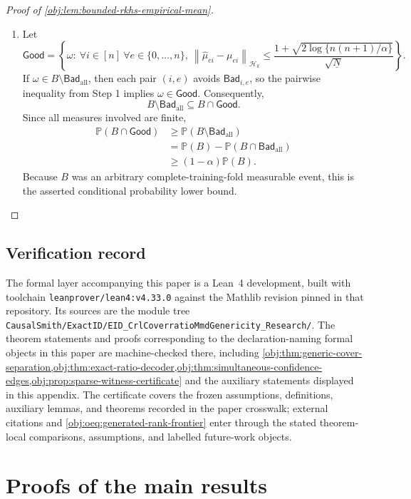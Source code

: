 \documentclass[11pt]{article}
\begin{document}
\begin{proof}[Proof of \cref{obj:lem:bounded-rkhs-empirical-mean}]
\begin{enumerate}
\item Let
\[
\mathsf{Good}
=
\left\{
\omega:\ 
\forall i\in[n]\ \forall e\in\{0,\ldots,n\},\
\left\|\widehat\mu_{ei}-\mu_{ei}\right\|_{\mathcal H_k}
\le
\frac{1+\sqrt{2\log\{n(n+1)/\alpha\}}}{\sqrt{\underline N}}
\right\}.
\]
If \(\omega\in B\setminus\mathsf{Bad}_{\mathrm{all}}\), then each pair \((i,e)\) avoids \(\mathsf{Bad}_{i,e}\), so the pairwise inequality from Step 1 implies \(\omega\in\mathsf{Good}\).  Consequently,
\[
B\setminus\mathsf{Bad}_{\mathrm{all}}\subseteq B\cap\mathsf{Good}.
\]
Since all measures involved are finite,
\[
\begin{aligned}
\mathbb P(B\cap\mathsf{Good})
&\ge
\mathbb P(B\setminus\mathsf{Bad}_{\mathrm{all}})\\
&=
\mathbb P(B)-\mathbb P(B\cap\mathsf{Bad}_{\mathrm{all}})\\
&\ge
(1-\alpha)\mathbb P(B).
\end{aligned}
\]
Because \(B\) was an arbitrary complete-training-fold measurable event, this is the asserted conditional probability lower bound. %
\end{enumerate}
\end{proof}

\subsection*{Verification record}

The formal layer accompanying this paper is a Lean~4 development, built with toolchain \texttt{leanprover/lean4:v4.33.0} against the Mathlib revision pinned in that repository. Its sources are the module tree \texttt{CausalSmith/ExactID/EID\_CrlCoverratioMmdGenericity\_Research/}. The theorem statements and proofs corresponding to the declaration-naming formal objects in this paper are machine-checked there, including \cref{obj:thm:generic-cover-separation,obj:thm:exact-ratio-decoder,obj:thm:simultaneous-confidence-edges,obj:prop:sparse-witness-certificate} and the auxiliary statements displayed in this appendix. The certificate covers the frozen assumptions, definitions, auxiliary lemmas, and theorems recorded in the paper crosswalk; external citations and \cref{obj:oeq:generated-rank-frontier} enter through the stated theorem-local comparisons, assumptions, and labelled future-work objects.


\section{Proofs of the main results}\label{sec:deferred-proofs}
\end{document}
